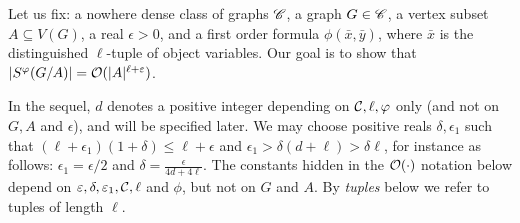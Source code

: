  Let us fix: a nowhere dense class of graphs $\CCC$, a graph $G\in \CCC$, a vertex subset $A\subseteq V(G)$, a real $\epsilon>0$, and 
 a first order formula $\phi(\bar x,\bar y)$, where $\bar x$ is the distinguished $\ell$-tuple of object variables.
 Our goal is to show that $|S^\phi(G/A)|=\Oof(|A|^{\ell+\epsilon})$.
 	   
In the sequel, $d$ denotes a positive integer 
depending on ${\cal C},\ell,\phi$ only (and not on $G, A$ and $\epsilon$), and will be specified later. We may choose positive reals
$\delta,\epsilon_1$ such that 
	 $(\ell+\epsilon_1)(1+\delta) 
	 \le
	 \ell+\epsilon$ and $\epsilon_1>\delta(d+\ell)> \delta\ell$, for instance as follows: $\epsilon_1=\epsilon/2$ and $\delta=\frac{\epsilon}{4d+4\ell}$.
The constants hidden in the $\Oof(\cdot)$ notation below depend
 on $\epsilon,\delta,\epsilon_1,\cal C, \ell$ and $\phi$, but not on $G$ and $A$.   By \emph{tuples} below we refer to tuples of length $\ell$.

